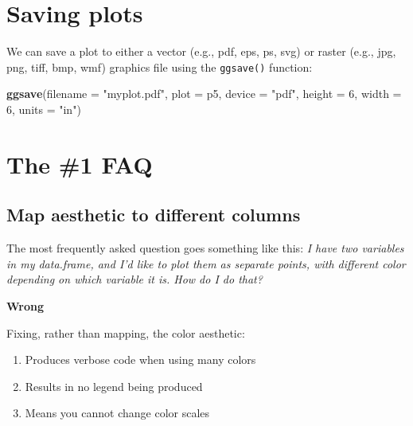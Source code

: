 \documentclass[
]{book}
\newenvironment{Shaded}{\begin{snugshade}}{\end{snugshade}}
\newcommand{\DataTypeTok}[1]{\textcolor[rgb]{0.13,0.29,0.53}{#1}}
\newcommand{\DecValTok}[1]{\textcolor[rgb]{0.00,0.00,0.81}{#1}}
\newcommand{\KeywordTok}[1]{\textcolor[rgb]{0.13,0.29,0.53}{\textbf{#1}}}
\newcommand{\NormalTok}[1]{#1}
\newcommand{\StringTok}[1]{\textcolor[rgb]{0.31,0.60,0.02}{#1}}
\providecommand{\tightlist}{%
  \setlength{\itemsep}{0pt}\setlength{\parskip}{0pt}}
\begin{document}
\hypertarget{saving-plots}{%
\section{Saving plots}\label{saving-plots}}

We can save a plot to either a vector (e.g., pdf, eps, ps, svg)
or raster (e.g., jpg, png, tiff, bmp, wmf) graphics file using
the \texttt{ggsave()} function:

\begin{Shaded}
\begin{Highlighting}[]
\KeywordTok{ggsave}\NormalTok{(}\DataTypeTok{filename =} \StringTok{"myplot.pdf"}\NormalTok{, }\DataTypeTok{plot =}\NormalTok{ p5, }\DataTypeTok{device =} \StringTok{"pdf"}\NormalTok{, }
       \DataTypeTok{height =} \DecValTok{6}\NormalTok{, }\DataTypeTok{width =} \DecValTok{6}\NormalTok{, }\DataTypeTok{units =} \StringTok{"in"}\NormalTok{)}
\end{Highlighting}
\end{Shaded}

\hypertarget{the-1-faq}{%
\section{The \#1 FAQ}\label{the-1-faq}}

\hypertarget{map-aesthetic-to-different-columns}{%
\subsection{Map aesthetic to different columns}\label{map-aesthetic-to-different-columns}}

The most frequently asked question goes something like this: \emph{I have two variables in my data.frame, and I'd like to plot them as separate points, with different color depending on which variable it is. How do I do that?}

\textbf{Wrong}

Fixing, rather than mapping, the color aesthetic:

\begin{enumerate}
\def\labelenumi{\arabic{enumi}.}
\tightlist
\item
  Produces verbose code when using many colors
\item
  Results in no legend being produced
\item
  Means you cannot change color scales
\end{enumerate}
\end{document}
